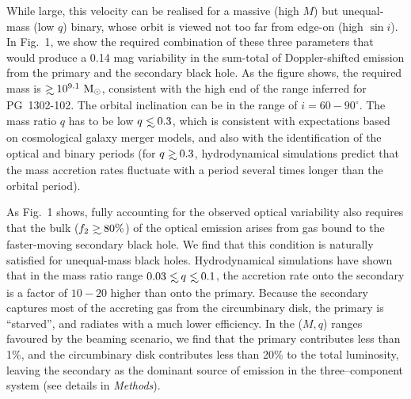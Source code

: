 While large, this velocity can be realised for a massive (high $M$)
but unequal-mass (low $q$) binary, whose orbit is viewed not too far
from edge-on (high $\sin i$).  In Fig.~1, we show the required
combination of these three parameters that would produce a 0.14 mag
variability in the sum-total of Doppler-shifted emission from the
primary and the secondary black hole.  As the figure shows, the
required mass is $\gsim 10^{9.1}~{\rm M_\odot}$, consistent with the
high end of the range inferred for PG~1302-102.  The orbital
inclination can be in the range of $i=60-90^\circ$.  The mass ratio
$q$ has to be low $q\lsim 0.3$, which is consistent with expectations
based on cosmological galaxy merger models\cite{Volonteri+2003}, and
also with the identification of the optical and binary periods (for
$q\gsim 0.3$, hydrodynamical simulations predict that the mass
accretion rates fluctuate with a period several times longer than the
orbital period\cite{PG1302MNRAS:2015a}).

As Fig.~1 shows, fully accounting for the observed optical variability
also requires that the bulk ($f_2\gsim 80\%$) of the optical emission
arises from gas bound to the faster-moving secondary black hole. We
find that this condition is naturally satisfied for unequal-mass black
holes. Hydrodynamical simulations have shown that in the mass ratio
range $0.03\lsim q\lsim 0.1$, the accretion rate onto the secondary is
a factor of $10-20$ higher than onto the primary\cite{Farris:2014}.
Because the secondary captures most of the accreting gas from the
circumbinary disk, the primary is ``starved'', and radiates with a
much lower efficiency.  In the ($M,q$) ranges favoured by the beaming
scenario, we find that the primary contributes less than 1\%, and the
circumbinary disk contributes less than 20\% to the total luminosity,
leaving the secondary as the dominant source of emission in the
three--component system (see details in {\it Methods}).

